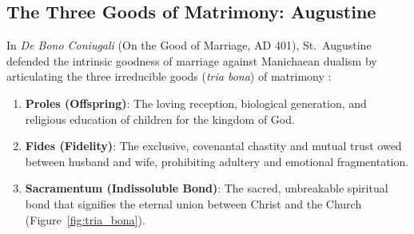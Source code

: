 \documentclass[11pt,twocolumn]{article}
\begin{document}
\subsection{The Three Goods of Matrimony: Augustine}
In \textit{De Bono Coniugali} (On the Good of Marriage, AD 401), St.~Augustine defended the intrinsic goodness of marriage against Manichaean dualism by articulating the three irreducible goods (\textit{tria bona}) of matrimony \cite{augustine_bono}:
\begin{enumerate}
    \item \textbf{Proles (Offspring)}: The loving reception, biological generation, and religious education of children for the kingdom of God.
    \item \textbf{Fides (Fidelity)}: The exclusive, covenantal chastity and mutual trust owed between husband and wife, prohibiting adultery and emotional fragmentation.
    \item \textbf{Sacramentum (Indissoluble Bond)}: The sacred, unbreakable spiritual bond that signifies the eternal union between Christ and the Church (Figure~\ref{fig:tria_bona}).
\end{enumerate}
\end{document}
